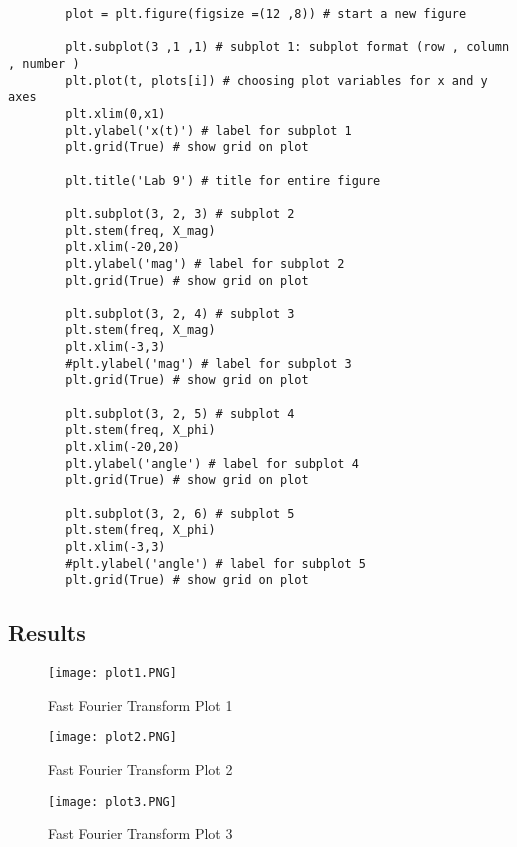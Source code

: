 \begin{scriptsize}
\begin{lstlisting}
        plot = plt.figure(figsize =(12 ,8)) # start a new figure
    
        plt.subplot(3 ,1 ,1) # subplot 1: subplot format (row , column , number )
        plt.plot(t, plots[i]) # choosing plot variables for x and y axes
        plt.xlim(0,x1)
        plt.ylabel('x(t)') # label for subplot 1
        plt.grid(True) # show grid on plot
        
        plt.title('Lab 9') # title for entire figure 
        
        plt.subplot(3, 2, 3) # subplot 2
        plt.stem(freq, X_mag)
        plt.xlim(-20,20)
        plt.ylabel('mag') # label for subplot 2
        plt.grid(True) # show grid on plot
        
        plt.subplot(3, 2, 4) # subplot 3
        plt.stem(freq, X_mag)
        plt.xlim(-3,3)
        #plt.ylabel('mag') # label for subplot 3
        plt.grid(True) # show grid on plot
        
        plt.subplot(3, 2, 5) # subplot 4
        plt.stem(freq, X_phi)
        plt.xlim(-20,20)
        plt.ylabel('angle') # label for subplot 4
        plt.grid(True) # show grid on plot
        
        plt.subplot(3, 2, 6) # subplot 5
        plt.stem(freq, X_phi)
        plt.xlim(-3,3)
        #plt.ylabel('angle') # label for subplot 5
        plt.grid(True) # show grid on plot
\end{lstlisting}
\end{scriptsize}

\subsection{Results}

\begin{figure}[H]
   	\centering
   	\texttt{[image: plot1.PNG]}
   	\caption{Fast Fourier Transform Plot 1}
\end{figure}
 
\begin{figure}[H]
    \centering
    \texttt{[image: plot2.PNG]}
   	\caption{Fast Fourier Transform Plot 2}
\end{figure}
  
\begin{figure}[H]
   	\centering
   	\texttt{[image: plot3.PNG]}
   	\caption{Fast Fourier Transform Plot 3}
\end{figure}
 
